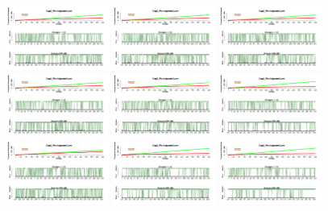\begin{figure}[th]
\centering
\includegraphics[width=0.30\textwidth]{Figures/Success_Exp2_P1} \includegraphics[width=0.30\textwidth]{Figures/Success_Exp2_P2} \includegraphics[width=0.30\textwidth]{Figures/Success_Exp2_P3}
\includegraphics[width=0.30\textwidth]{Figures/Success_Exp2_P4} \includegraphics[width=0.30\textwidth]{Figures/Success_Exp2_P5} \includegraphics[width=0.30\textwidth]{Figures/Success_Exp2_P6}
\includegraphics[width=0.30\textwidth]{Figures/Success_Exp2_P7} \includegraphics[width=0.30\textwidth]{Figures/Success_Exp2_P8} \includegraphics[width=0.30\textwidth]{Figures/Success_Exp2_P9}

\end{figure}
